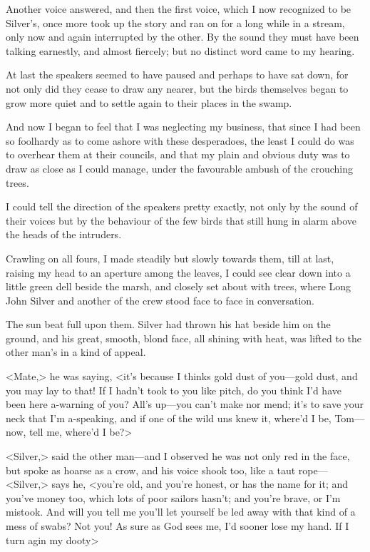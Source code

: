Another voice answered, and then the first voice, which I now recognized to be Silver's, once more took up the story and ran on for a long while in a stream, only now and again interrupted by the other. By the sound they must have been talking earnestly, and almost fiercely; but no distinct word came to my hearing.

At last the speakers seemed to have paused and perhaps to have sat down, for not only did they cease to draw any nearer, but the birds themselves began to grow more quiet and to settle again to their places in the swamp.

And now I began to feel that I was neglecting my business, that since I had been so foolhardy as to come ashore with these desperadoes, the least I could do was to overhear them at their councils, and that my plain and obvious duty was to draw as close as I could manage, under the favourable ambush of the crouching trees.

I could tell the direction of the speakers pretty exactly, not only by the sound of their voices but by the behaviour of the few birds that still hung in alarm above the heads of the intruders.

Crawling on all fours, I made steadily but slowly towards them, till at last, raising my head to an aperture among the leaves, I could see clear down into a little green dell beside the marsh, and closely set about with trees, where Long John Silver and another of the crew stood face to face in conversation.

The sun beat full upon them. Silver had thrown his hat beside him on the ground, and his great, smooth, blond face, all shining with heat, was lifted to the other man's in a kind of appeal.

<Mate,> he was saying, <it's because I thinks gold dust of you—gold dust, and you may lay to that! If I hadn't took to you like pitch, do you think I'd have been here a-warning of you? All's up—you can't make nor mend; it's to save your neck that I'm a-speaking, and if one of the wild uns knew it, where'd I be, Tom—now, tell me, where'd I be?>

<Silver,> said the other man—and I observed he was not only red in the face, but spoke as hoarse as a crow, and his voice shook too, like a taut rope—<Silver,> says he, <you're old, and you're honest, or has the name for it; and you've money too, which lots of poor sailors hasn't; and you're brave, or I'm mistook. And will you tell me you'll let yourself be led away with that kind of a mess of swabs? Not you! As sure as God sees me, I'd sooner lose my hand. If I turn agin my dooty\longdash>

